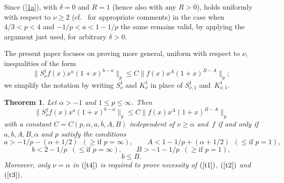 \documentclass[leqno,a4paper]{amsart}
\newtheorem{Theorem}{Theorem}
\begin{document}
Since (\ref{1a}), with $\delta=0$ and $R=1$ (hence also with any $R>0$),
holds uniformly with respect to $\nu\ge2$ (cf.~\cite{St} for appropriate
comments) in the case when $4/3<p<4$ and $-1/p<a<1-1/p$ the same remains valid,
by applying the argument just used, for arbitrary $\delta>0$.

The present paper focuses on proving more general, uniform with respect to
$\nu$, inequalities of the form
$$
\|S_\nu^1 f(x)x^a(1+x)^{b-a}\|_p\le C\|f(x)x^A(1+x)^{B-A}\|_p;
$$
we simplify the notation by writing $S_\nu^1$ and $K_\nu^1$
in place of $S_{\nu,1}^1$ and~$K_{\nu,1}^1$.

\begin{Theorem}
\label{Theorem:main}
Let $\alpha>-1$ and $1\le p\le\infty$. Then
\begin{equation}
\|S_\nu^1 f(x)x^a(1+x)^{b-a}\|_p\le C\|f(x)x^A(1+x)^{B-A}\|_p
\label{t4}
\end{equation}
with a constant $C=C(p,\alpha,a,b,A,B)$ independent of $\nu\ge\alpha$ and~$f$
if and only if $a,b,A,B, \alpha$ and $p$ satisfy the conditions
\begin{equation}
a>-1/p-(\alpha+1/2)\,\,\,(\ge \text{if } p=\infty), \qquad
A<1-1/p+(\alpha+1/2)\,\,\,(\le \text{if } p=1),
\label{t1}
\end{equation}
\begin{equation}
b<2-1/p\,\,\,(\le \text{if } p=\infty),
\qquad  B>-1-1/p\,\,\,(\ge \text{if }p=1),
\label{t2}
\end{equation}
\begin{equation}
b \le B.
\label{t3}
\end{equation}
Moreover, only $\nu=\alpha$ in $(\ref{t4})$ is required to prove necessity of
$(\ref{t1})$, $(\ref{t2})$ and $(\ref{t3})$.
\end{Theorem}
\end{document}
